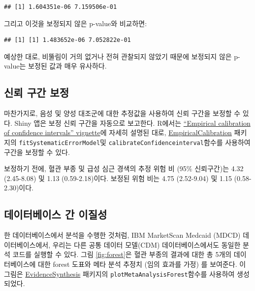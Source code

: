 \documentclass[10.5pt]{book}
\newenvironment{Shaded}{\begin{snugshade}}{\end{snugshade}}
\newcommand{\OperatorTok}[1]{\textcolor[rgb]{0.81,0.36,0.00}{\textbf{#1}}}
\newcommand{\NormalTok}[1]{#1}
\theoremstyle{definition}
\theoremstyle{definition}
\theoremstyle{definition}
\theoremstyle{remark}
\begin{document}
\begin{verbatim}
## [1] 1.604351e-06 7.159506e-01
\end{verbatim}

그리고 이것을 보정되지 않은 p-value와 비교하면:

\begin{Shaded}
\end{Shaded}

\begin{verbatim}
## [1] [1] 1.483652e-06 7.052822e-01
\end{verbatim}

예상한 대로, 비뚤림이 거의 없거나 전혀 관찰되지 않았기 때문에 보정되지
않은 p-value는 보정된 값과 매우 유사하다.

\subsection{신뢰 구간 보정}\label{---1}

마찬가지로, 음성 및 양성 대조군에 대한 추정값을 사용하여 신뢰 구간을
보정할 수 있다. Shiny 앱은 보정 신뢰 구간을 자동으로 보고한다. R에서는
\href{https://ohdsi.github.io/EmpiricalCalibration/articles/EmpiricalCiCalibrationVignette.html}{``Empirical
calibration of confidence intervals'' vignette}에 자세히 설명된 대로,
\href{https://ohdsi.github.io/EmpiricalCalibration/}{EmpiricalCalibration}
패키지의 \texttt{fitSystematicErrorModel}및
\texttt{calibrateConfidenceinterval}함수를 사용하여 구간을 보정할 수
있다.

보정하기 전에, 혈관 부종 및 급성 심근 경색의 추정 위험 비 (95\%
신뢰구간)는 4.32 (2.45-8.08) 및 1.13 (0.59-2.18)이다. 보정된 위험 비는
4.75 (2.52-9.04) 및 1.15 (0.58-2.30)이다.

\subsection{데이터베이스 간 이질성}\label{--}

한 데이터베이스에서 분석을 수행한 것처럼, IBM MarketScan Medcaid (MDCD)
데이터베이스에서, 우리는 다른 공통 데이터 모델(CDM) 데이터베이스에서도
동일한 분석 코드를 실행할 수 있다. 그림 \ref{fig:forest}은 혈관 부종의
결과에 대한 총 5개의 데이터베이스에 대한 forest 도표와 메타 분석 추정치
(임의 효과를 가정) \citep{dersimonian_1986}를 보여준다. 이 그림은
\href{https://ohdsi.github.io/EvidenceSynthesis/}{EvidenceSynthesis}
패키지의 \texttt{plotMetaAnalysisForest}함수를 사용하여 생성되었다.
\end{document}
